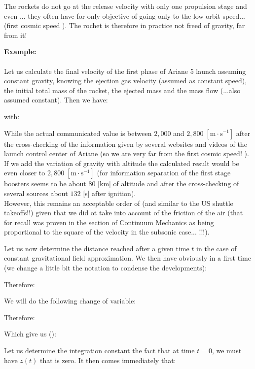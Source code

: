 	The rockets do not go at the release velocity with only one propulsion stage and even ... they often have for only objective of going only to the low-orbit speed... (first cosmic speed ). The rochet is therefore in practice not freed of gravity, far from it!
	\begin{tcolorbox}[colframe=black,colback=white,sharp corners]
	\textbf{{\Large {}}Example:}\\\\
	Let us calculate the final velocity of the first phase of Ariane 5 launch assuming constant gravity, knowing the ejection gas velocity (assumed as constant speed), the initial total mass of the rocket, the ejected mass and the mass flow (...also assumed constant). Then we have:
	
	with:
	
	While the actual communicated value is between $2,000$ and $2,800\; [\text{m}\cdot\text{s}^{-1}]$ after the cross-checking of the information given by several websites and videos of the launch control center of Ariane (so we are very far from the first cosmic speed! ). If we add the variation of gravity with altitude the calculated result would be even closer to $2,800\; [\text{m}\cdot\text{s}^{-1}]$ (for information separation of the first stage boosters seems to be about $80$ [km] of altitude and after the cross-checking of several sources about $132$ [s] after ignition).\\
	
	However, this remains an acceptable order of (and similar to the US shuttle takeoffs!!) given that we did ot take into account of the friction of the air (that for recall was proven in the section of Continuum Mechanics as being proportional to the square of the velocity in the subsonic case... !!!).
	\end{tcolorbox}
	Let us now determine the distance reached after a given time $t$ in the case of constant gravitational field approximation. We then have obviously in a first time (we change a little bit the notation to condense the developments):
	
	Therefore:
	
	We will do the following change of variable:
	
	Therefore:
	
	Which give us ():
	
	Let us determine the integration constant the fact that at time $t = 0$, we must have $z (t)$ that is zero. It then comes immediately that:
	
